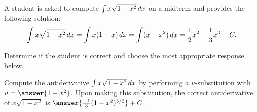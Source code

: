 \documentclass{ximera}
\author{}
\begin{document}
\begin{exercise}

   A student is asked to compute $\int x \sqrt{1 - x^2} \mathop{}\!d x$ on a midterm and provides the following solution:
   \[
     \int x \sqrt{1 - x^2} \mathop{}\!d x = \int x(1 - x) \mathop{}\!d x = \int (x - x^2) \mathop{}\!d x = \frac{1}{2}x^2 - \frac{1}{3} x^3 + C.
   \]
   
   \begin{problem}
   Determine if the student is correct and choose the most appropriate response below.
   \begin{multipleChoice}
   \end{multipleChoice}
   \end{problem}
   
   \begin{problem}
     Compute the antiderivative $\int x \sqrt{1 - x^2} \mathop{}\!d x$ by performing a
     $u$-substitution with $u = \answer{1 - x^2}$.  Upon making this
     substitution, the correct antiderivative of $x \sqrt{1 - x^2}$ is
     $\answer{\frac{-1}{3} (1 - x^2)^{3/2}} + C$.
   \end{problem}

\end{exercise}
\end{document}
